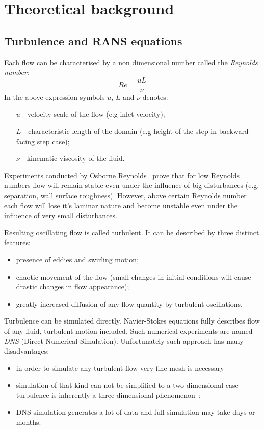 \chapter{Theoretical background}
    \section{Turbulence and RANS equations}
        \label{ch::turbulence}
        Each flow can be characterised by a non dimensional number called the \emph{Reynolds number}:
        \begin{equation}
        Re = \dfrac{uL}{\nu}
        \end{equation}
        In the above expression symbols $u$, $L$ and $\nu$ denotes:
        \begin{itemize}
        \item[$u$] - velocity scale of the flow (e.g inlet velocity);
        \item[$L$] - characteristic length of the domain (e.g height of the step in backward facing step case);
        \item[$\nu$] - kinematic viscosity of the fluid.
        \end{itemize}
        Experiments conducted by Osborne Reynolds~\cite{Reynolds1883} prove that for low Reynolds numbers flow will remain stable even under the influence of big disturbances (e.g. separation, wall surface roughness).
        However, above certain Reynolds number each flow will lose it's laminar nature and become unstable even under the influence of very small disturbances. 
        
        Resulting oscillating flow is called turbulent. It can be described by three distinct features:
        \begin{itemize}
            \item presence of eddies and swirling motion;
            \item chaotic movement of the flow (small changes in initial conditions will cause drastic changes in flow appearance);
            \item greatly increased diffusion of any flow quantity by turbulent oscillations. 
        \end{itemize}

        Turbulence can be simulated directly. 
        Navier-Stokes equations fully describes flow of any fluid, turbulent motion included.
        Such numerical experiments are named \emph{DNS} (Direct Numerical Simulation).
        Unfortunately such approach has many disadvantages:
        \begin{itemize}
        \item in order to simulate any turbulent flow very fine mesh is necessary~\cite{Wilcox}
        \item simulation of that kind can not be simplified to a two dimensional case - turbulence is inherently a three dimensional phenomenon~\cite{landau2013fluid};
        \item DNS simulation generates a lot of data and full simulation may take days or months.
        \end{itemize}

